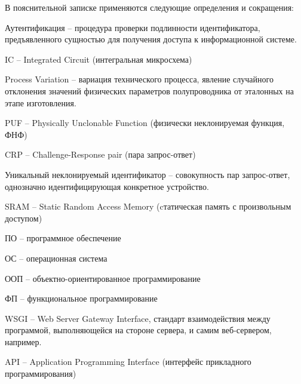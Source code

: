 
В пояснительной записке применяются следующие определения и сокращения:

Аутентификация -- процедура проверки подлинности идентификатора, предъявленного сущностью для получения доступа к информационной системе.

IC -- Integrated Circuit (интегральная микросхема)

Process Variation -- вариация технического процесса, явление случайного отклонения значений физических параметров полупроводника от эталонных на этапе изготовления.

PUF -- Physically Unclonable Function (физически неклонируемая функция, ФНФ)

CRP -- Challenge-Response pair (пара запрос-ответ)

Уникальный неклонируемый идентификатор -- совокупность пар запрос-ответ, однозначно идентифицирующая конкретное устройство.

SRAM -- Static Random Access Memory (cтатическая память с произвольным доступом)

ПО -- программное обеспечение

ОС -- операционная система

ООП -- объектно-ориентированное программирование

ФП -- функциональное программирование

WSGI -- Web Server Gateway Interface, стандарт взаимодействия между программой, выполняющейся на стороне сервера, и самим веб-сервером, например.

API -- Application Programming Interface (интерфейс прикладного программирования)


\clearpage
